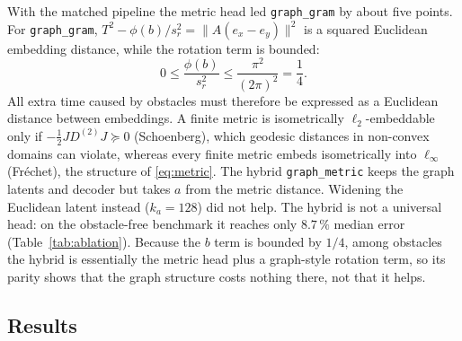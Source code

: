 \documentclass[11pt]{article}
\newcommand{\code}[1]{\texttt{#1}}
\newcommand{\pct}{\,\%}
\begin{document}
With the matched pipeline the metric head led \code{graph\_gram} by about five points. For
\code{graph\_gram}, $T^2-\phi(b)/s_r^2=\|A(e_x-e_y)\|^2$ is a squared Euclidean embedding distance,
while the rotation term is bounded:
\begin{equation}
0\le\frac{\phi(b)}{s_r^2}\le\frac{\pi^2}{(2\pi)^2}=\frac14 .
\end{equation}
All extra time caused by obstacles must therefore be expressed as a Euclidean distance between
embeddings. A finite metric is isometrically $\ell_2$-embeddable only if
$-\tfrac12JD^{(2)}J\succeq0$ (Schoenberg), which geodesic distances in non-convex domains can
violate, whereas every finite metric embeds isometrically into $\ell_\infty$ (Fr\'echet), the
structure of \eqref{eq:metric}. The hybrid \code{graph\_metric} keeps the graph latents and decoder but
takes $a$ from the metric distance. Widening the Euclidean latent instead ($k_a=128$) did not help.
The hybrid is not a universal head: on the obstacle-free benchmark it reaches only $8.7\pct$ median
error (Table~\ref{tab:ablation}). Because the $b$ term is bounded by $1/4$, among obstacles the hybrid
is essentially the metric head plus a graph-style rotation term, so its parity shows that the graph
structure costs nothing there, not that it helps.

\subsection{Results}

\begin{table}[t]\centering\scriptsize\setlength{\tabcolsep}{4pt}
\caption{Stage E, all 1000 test cases per environment, success (\%) per MPPI variant and failure
counts of the forward planner. $^\dagger$Native NTFields pipeline, checkpoints of seeds 1 and 2
(Lie-Shape-NTFields, epoch 4000) with the same evaluator and test set; its research notes report
$81.9\pm0.5\pct$ over five seeds on this environment.}
\label{tab:stagee}
\end{table}
\end{document}
